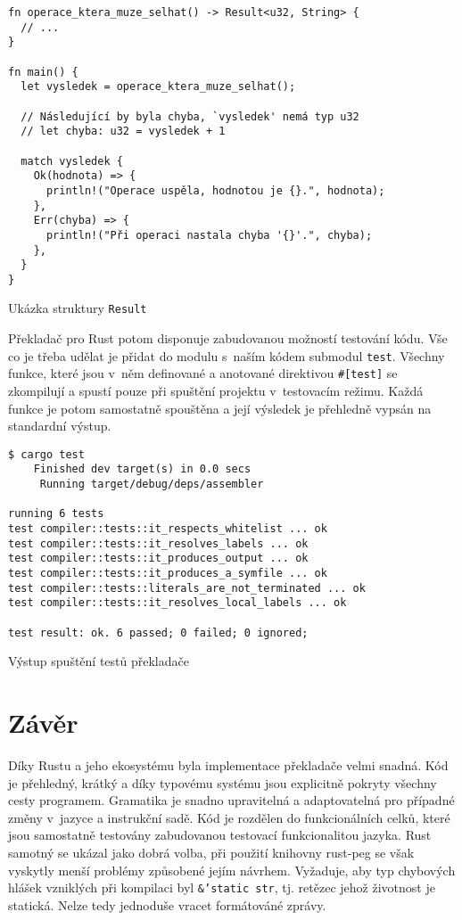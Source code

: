 \begin{listing}[htbp]
\begin{verbatim}
fn operace_ktera_muze_selhat() -> Result<u32, String> {
  // ...
} 

fn main() {
  let vysledek = operace_ktera_muze_selhat();
  
  // Následující by byla chyba, `vysledek' nemá typ u32
  // let chyba: u32 = vysledek + 1
  
  match vysledek {
    Ok(hodnota) => {
      println!("Operace uspěla, hodnotou je {}.", hodnota);
    },
    Err(chyba) => {
      println!("Při operaci nastala chyba '{}'.", chyba);
    },
  }
}
\end{verbatim}
\caption{Ukázka struktury \texttt{Result}}
\label{fig:rust-result}
\end{listing}

Překladač pro Rust potom disponuje zabudovanou možností testování kódu. Vše co je třeba udělat je přidat do modulu s~naším kódem submodul \texttt{test}. Všechny funkce, které jsou v~něm definované a anotované direktivou \texttt{#[test]} se zkompilují a spustí pouze při spuštění projektu v~testovacím režimu. Každá funkce je potom samostatně spouštěna a její výsledek je přehledně vypsán na standardní výstup.

\begin{listing}[htbp]
\begin{verbatim}
$ cargo test
    Finished dev target(s) in 0.0 secs
     Running target/debug/deps/assembler

running 6 tests
test compiler::tests::it_respects_whitelist ... ok
test compiler::tests::it_resolves_labels ... ok
test compiler::tests::it_produces_output ... ok
test compiler::tests::it_produces_a_symfile ... ok
test compiler::tests::literals_are_not_terminated ... ok
test compiler::tests::it_resolves_local_labels ... ok

test result: ok. 6 passed; 0 failed; 0 ignored;
\end{verbatim}
\caption{Výstup spuštění testů překladače}
\label{fig:rust-test}
\end{listing}

\section{Závěr}

Díky Rustu a jeho ekosystému byla implementace překladače velmi snadná. Kód je přehledný, krátký a díky typovému systému jsou explicitně pokryty všechny cesty programem. Gramatika je snadno upravitelná a adaptovatelná pro případné změny v~jazyce a instrukční sadě. Kód je rozdělen do funkcionálních celků, které jsou samostatně testovány zabudovanou testovací funkcionalitou jazyka. Rust samotný se ukázal jako dobrá volba, při použití kni\-hov\-ny rust-peg se však vyskytly menší problémy způsobené jejím návrhem. Vyžaduje, aby typ chybových hlášek vzniklých při kompilaci byl \texttt{&'static str}, tj. retězec jehož životnost je statická. Nelze tedy jednoduše vracet formátováné zprávy.
